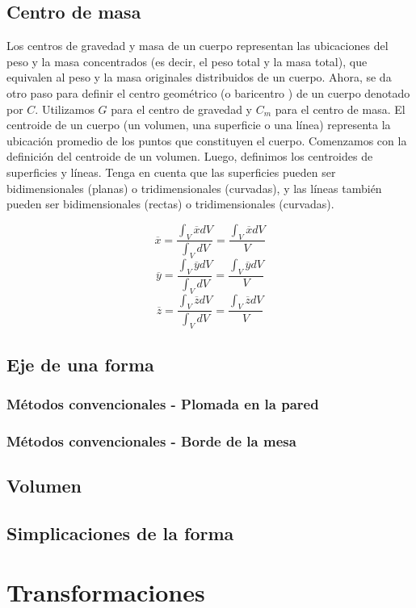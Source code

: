 \section{Centro de masa}%
Los centros de gravedad y masa de un cuerpo representan las ubicaciones del peso y la masa concentrados (es decir, el peso total y la masa total), que equivalen al peso y la masa originales distribuidos de un cuerpo. Ahora, se da otro paso para definir el centro geométrico (o baricentro ) de un cuerpo denotado por $C$. Utilizamos $G$ para el centro de gravedad y $C_m$ para el centro de masa. El centroide de un cuerpo (un volumen, una superficie o una línea) representa la ubicación promedio de los puntos que constituyen el cuerpo. Comenzamos con la definición del centroide de un volumen. Luego, definimos los centroides de superficies y líneas. Tenga en cuenta que las superficies pueden ser bidimensionales (planas) o tridimensionales (curvadas), y las líneas también pueden ser bidimensionales (rectas) o tridimensionales (curvadas).

$$\overline{x}=\frac{\int_V\overline{x}dV}{\int_VdV}=\frac{\int_V\overline{x}dV}{V}$$
$$\overline{y}=\frac{\int_V\overline{y}dV}{\int_VdV}=\frac{\int_V\overline{y}dV}{V}$$
$$\overline{z}=\frac{\int_V\overline{z}dV}{\int_VdV}=\frac{\int_V\overline{z}dV}{V}$$
\section{Eje de una forma}
\subsection{Métodos convencionales - Plomada en la pared}
\subsection{Métodos convencionales - Borde de la mesa}
\section{Volumen}

\section{Simplicaciones de la forma}


\chapter{Transformaciones}

